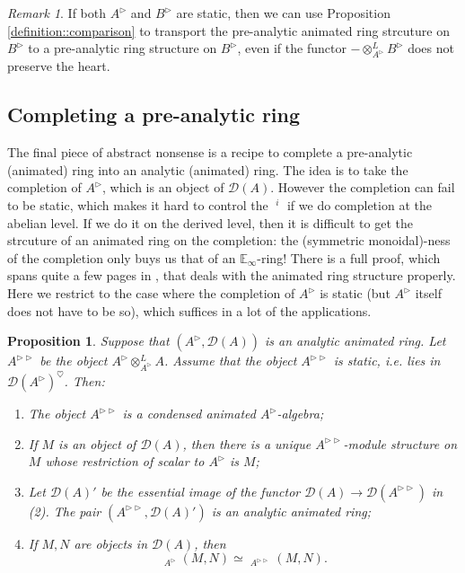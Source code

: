 \documentclass{article}
\theoremstyle{plain}
\newtheorem{prop}[thm]{Proposition}
\theoremstyle{definition}
\theoremstyle{remark}
\newtheorem{rmk}[thm]{Remark}
\DeclareMathOperator{\rhoms}{\underline{RHom}}
\DeclareMathOperator{\exts}{\underline{Ext}}
\newcommand{\dten}{\otimes ^{L}}
\newcommand{\huflag}{\triangleright}
\newcommand{\D}{\mathcal{D}}
\newcommand{\heart}{\heartsuit}
\begin{document}
\begin{rmk}
If both $ A ^{\huflag} $ and $ B ^{\huflag} $ are static, then we can use Proposition \ref{definition::comparison} to transport the
pre-analytic animated ring strcuture on $ B ^{\huflag} $ to a pre-analytic ring structure on $ B ^{\huflag} $,
even if the functor $ -\dten _{A ^{\huflag}}B ^{\huflag} $ does not preserve the heart.
\end{rmk}

\subsection{Completing a pre-analytic ring}

The final piece of abstract nonsense is a recipe to complete a pre-analytic (animated) ring into an analytic (animated) ring.
The idea is to take the completion of $ A ^{\huflag} $, which is an object of $ \D (A) $.
However the completion can fail to be static, which makes it hard to control the $ \exts ^{i} $ if we do completion at the abelian level.
If we do it on the derived level, then it is difficult to get the strcuture of an animated ring on the completion:
the (symmetric monoidal)-ness of the completion only buys us that of an $ \mathbb{E}_{\infty} $-ring!
There is a full proof, which spans quite a few pages in \cite{rodriguez-camargo_notes_nodate},
that deals with the animated ring structure properly.
Here we restrict to the case where the completion of $ A ^{\huflag} $ is static
(but $ A ^{\huflag} $ itself does not have to be so),
which suffices in a lot of the applications.
\begin{prop}
Suppose that $ (A ^{\huflag}, \D (A)) $ is an analytic animated ring.
Let $ A ^{\huflag\huflag} $ be the object $ A ^{\huflag} \dten _{A ^{\huflag}} A $.
Assume that the object $ A ^{\huflag\huflag} $ is static, i.e. lies in $ \D (A ^{\huflag})^{\heart} $.
Then:
\begin{enumerate}
\item The object $ A ^{\huflag\huflag} $ is a condensed animated $ A ^{\huflag} $-algebra;
\item If $ M $ is an object of $ \D (A) $, then there is a unique $ A ^{\huflag\huflag} $-module structure on $ M $
whose restriction of scalar to $ A ^{\huflag} $ is $ M $;
\item Let $ \D (A)' $ be the essential image of the functor $ \D (A)\to \D (A ^{\huflag\huflag}) $ in (2).
The pair $ (A ^{\huflag\huflag}, \D (A)') $ is an analytic animated ring;
\item If $ M,N $ are objects in $ \D (A) $, then
\begin{equation*}
\rhoms _{A ^{\huflag}}(M, N) \simeq \rhoms _{A ^{\huflag\huflag}}(M, N).
\end{equation*}
\end{enumerate}
\end{prop}
\end{document}
